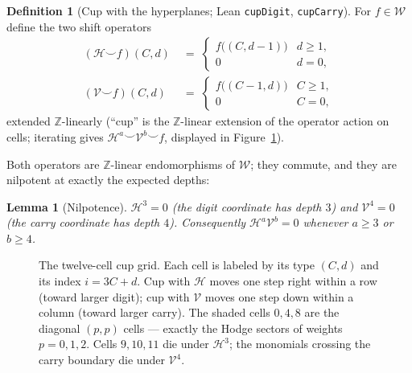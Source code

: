 \documentclass[11pt,a4paper]{article}
\theoremstyle{plain}
\newtheorem{lemma}[theorem]{Lemma}
\theoremstyle{definition}
\newtheorem{definition}[theorem]{Definition}
\newcommand{\Z}{\mathbb{Z}}
\newcommand{\C}{\mathbb{C}}
\newcommand{\HC}{\mathcal{H}}
\newcommand{\VV}{\mathcal{V}}
\newcommand{\cupop}{\smile}
\begin{document}
\begin{definition}[Cup with the hyperplanes; Lean \texttt{cupDigit},
\texttt{cupCarry}]\label{def:cup}
For $f \in \mathcal{W}$ define the two shift operators
\begin{align*}
  (\HC \cupop f)(C,d) & \;=\;
  \begin{cases}
    f\bigl((C,d-1)\bigr) & d \ge 1,\\
    0 & d = 0,
  \end{cases}
  \\[2mm]
  (\VV \cupop f)(C,d) & \;=\;
  \begin{cases}
    f\bigl((C-1,d)\bigr) & C \ge 1,\\
    0 & C = 0,
  \end{cases}
\end{align*}
extended $\Z$-linearly (``cup'' is the $\Z$-linear extension of the operator
action on cells; iterating gives $\HC^{a}\cupop\VV^{b}\cupop f$, displayed
in Figure~\ref{fig:cupgrid}).
\end{definition}

Both operators are $\Z$-linear endomorphisms of $\mathcal{W}$; they commute,
and they are nilpotent at exactly the expected depths:

\begin{lemma}[Nilpotence]\label{lem:nilpotent}
$\HC^{3} = 0$ (the digit coordinate has depth $3$) and $\VV^{4} = 0$ (the
carry coordinate has depth $4$). Consequently
$\HC^{a}\VV^{b} = 0$ whenever $a \ge 3$ or $b \ge 4$.
\end{lemma}

\begin{figure}[t]
\centering
{}
\caption{The twelve-cell cup grid. Each cell is labeled by its type $(C,d)$
and its index $i = 3C+d$. Cup with $\HC$ moves one step right within a row
(toward larger digit); cup with $\VV$ moves one step down within a column
(toward larger carry). The shaded cells $0,4,8$ are the diagonal
$(p,p)$ cells --- exactly the Hodge sectors of weights $p=0,1,2$. Cells
$9,10,11$ die under $\HC^{3}$; the monomials crossing the carry boundary
die under $\VV^{4}$.}
\label{fig:cupgrid}
\end{figure}
\end{document}
